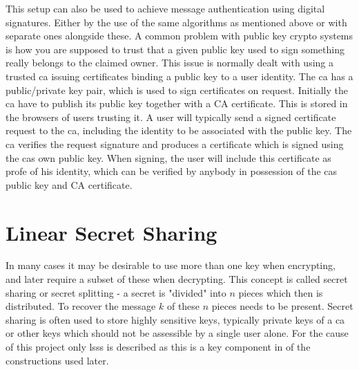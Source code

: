 This setup can also be used to achieve message authentication using digital signatures. Either by the use of the same algorithms as mentioned above or with separate ones alongside these. A common problem with public key crypto systems is how you are supposed to trust that a given public key used to sign something really belongs to the claimed owner. This issue is normally dealt with using a trusted \gls{ca} issuing certificates binding a public key to a user identity. The \gls{ca} has a public/private key pair, which is used to sign certificates on request. Initially the \gls{ca} have to publish its public key together with a CA certificate. This is stored in the browsers of users trusting it. A user will typically send a signed certificate request to the \gls{ca}, including the identity to be associated with the public key. The \gls{ca} verifies the request signature and produces a certificate which is signed using the \glspl{ca} own public key. When signing, the user will include this certificate as profe of his identity, which can be verified by anybody in possession of the \glspl{ca} public key and CA certificate. 


\section{Linear Secret Sharing}\label{subsec:lsss}
In many cases it may be desirable to use more than one key when encrypting, and later require a subset of these when decrypting. This concept is called secret sharing or secret splitting - a secret is "divided" into $n$ pieces which then is distributed. To recover the message $k$ of these $n$ pieces needs to be present. Secret sharing is often used to store highly sensitive keys, typically private keys of a \gls{ca} or other keys which should not be assessible by a single user alone. For the cause of this project only \gls{lsss} is described as this is a key component in of the constructions used later. 

